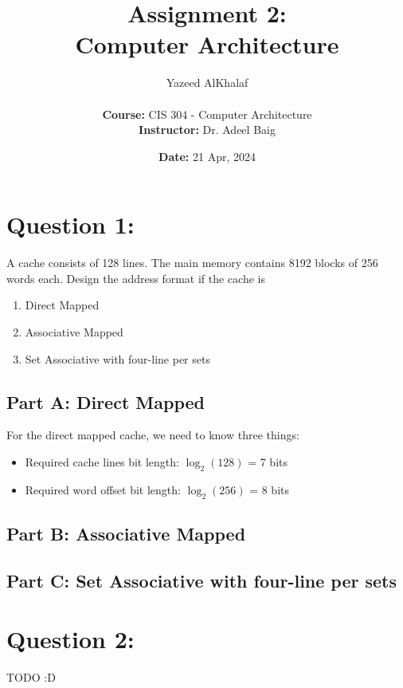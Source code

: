 \documentclass[a4paper]{article}
\title{\textbf{Assignment 2:\\Computer Architecture}}
\author{
    Yazeed AlKhalaf\\
    \\
    \textbf{Course:} CIS 304 - Computer Architecture\\
    \textbf{Instructor:} Dr. Adeel Baig
}
\date{\textbf{Date:} 21 Apr, 2024}
\begin{document}
\maketitle

\newpage

\tableofcontents

\newpage

\section{Question 1:}

A cache consists of 128 lines. The main memory contains 8192 blocks of 256
words each. Design the address format if the cache is

\begin{enumerate}[label=(\alph*)]
    \item Direct Mapped
    \item Associative Mapped
    \item Set Associative with four-line per sets
\end{enumerate}

\subsection{Part A: Direct Mapped}

For the direct mapped cache, we need to know three things:

\begin{itemize}
    \item Required cache lines bit length: $\log_2(128)$ = 7 bits
    \item Required word offset bit length: $\log_2(256)$ = 8 bits
\end{itemize}

\subsection{Part B: Associative Mapped}

\subsection{Part C: Set Associative with four-line per sets}

\section{Question 2:}

TODO :D
\end{document}

